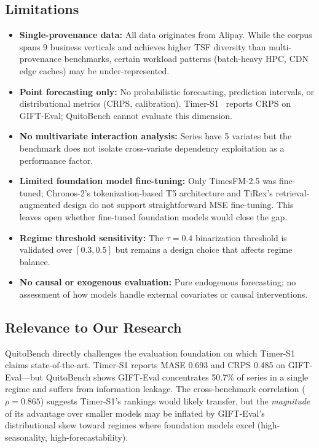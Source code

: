 \documentclass[11pt]{article}
\begin{document}
\subsection{Limitations}

\begin{itemize}
    \item \textbf{Single-provenance data:} All data originates from Alipay. While the corpus spans 9 business verticals and achieves higher TSF diversity than multi-provenance benchmarks, certain workload patterns (batch-heavy HPC, CDN edge caches) may be under-represented.
    \item \textbf{Point forecasting only:} No probabilistic forecasting, prediction intervals, or distributional metrics (CRPS, calibration). Timer-S1~\cite{timers1} reports CRPS on GIFT-Eval; QuitoBench cannot evaluate this dimension.
    \item \textbf{No multivariate interaction analysis:} Series have 5 variates but the benchmark does not isolate cross-variate dependency exploitation as a performance factor.
    \item \textbf{Limited foundation model fine-tuning:} Only TimesFM-2.5 was fine-tuned; Chronos-2's tokenization-based T5 architecture and TiRex's retrieval-augmented design do not support straightforward MSE fine-tuning. This leaves open whether fine-tuned foundation models would close the gap.
    \item \textbf{Regime threshold sensitivity:} The $\tau = 0.4$ binarization threshold is validated over $[0.3, 0.5]$ but remains a design choice that affects regime balance.
    \item \textbf{No causal or exogenous evaluation:} Pure endogenous forecasting; no assessment of how models handle external covariates or causal interventions.
\end{itemize}

\subsection{Relevance to Our Research}

QuitoBench directly challenges the evaluation foundation on which Timer-S1~\cite{timers1} claims state-of-the-art. Timer-S1 reports MASE 0.693 and CRPS 0.485 on GIFT-Eval---but QuitoBench shows GIFT-Eval concentrates 50.7\% of series in a single regime and suffers from information leakage. The cross-benchmark correlation ($\rho = 0.865$) suggests Timer-S1's rankings would likely transfer, but the \textit{magnitude} of its advantage over smaller models may be inflated by GIFT-Eval's distributional skew toward regimes where foundation models excel (high-seasonality, high-forecastability).
\end{document}

